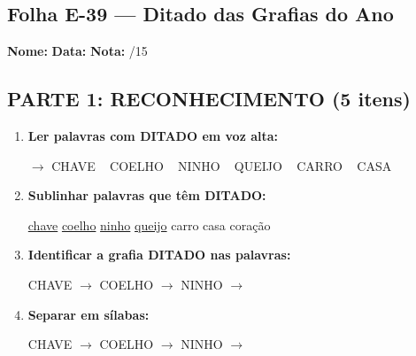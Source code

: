 \subsection{Folha E-39 --- Ditado das Grafias do Ano}
\begin{exercicio}



\noindent\textbf{Nome:} \underline{\hspace{3.2cm}} \quad \textbf{Data:} \underline{\hspace{1.6cm}} \quad \textbf{Nota:} \underline{\hspace{0.9cm}}/15


\subsection*{PARTE 1: RECONHECIMENTO (5 itens)}

\begin{enumerate}

  \item \textbf{Ler palavras com DITADO em voz alta:}
  \begin{center}
  $\rightarrow$ CHAVE ~ COELHO ~ NINHO ~ QUEIJO ~ CARRO ~ CASA
  \end{center}

  \item \textbf{Sublinhar palavras que têm DITADO:}

\begin{center}
  \uline{chave} \quad \uline{coelho} \quad \uline{ninho} \quad \uline{queijo} \quad carro \quad casa \quad coração
\end{center}

  \item \textbf{Identificar a grafia DITADO nas palavras:}
  \begin{center}
  CHAVE $\rightarrow$ \underline{\hspace{1cm}} \quad COELHO $\rightarrow$ \underline{\hspace{1cm}} \quad NINHO $\rightarrow$ \underline{\hspace{1cm}}
  \end{center}

  \item \textbf{Separar em sílabas:}
  \begin{center}
  CHAVE $\rightarrow$ \underline{\hspace{1.2cm}} \quad COELHO $\rightarrow$ \underline{\hspace{1.2cm}} \quad NINHO $\rightarrow$ \underline{\hspace{1.2cm}}
  \end{center}


\end{enumerate}
\end{exercicio}
